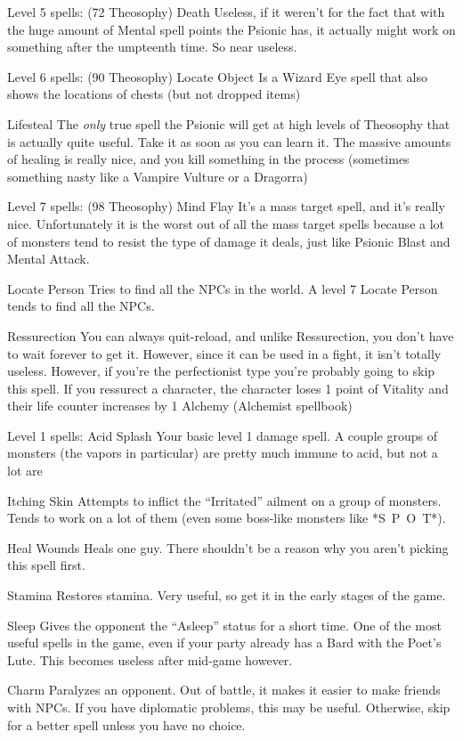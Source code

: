 \documentclass[12pt]{article}
\newcommand{\WviiSPOT}{\mbox{*S~P~O~T*}}
\begin{document}
Level 5 spells: (72 Theosophy) Death Useless, if it weren't for the fact
that with the huge amount of Mental spell points the Psionic has, it
actually might work on something after the umpteenth time. So near
useless.

Level 6 spells: (90 Theosophy) Locate Object Is a Wizard Eye spell that
also shows the locations of chests (but not dropped items)

Lifesteal The \emph{only} true spell the Psionic will get at high levels
of Theosophy that is actually quite useful. Take it as soon as you can
learn it. The massive amounts of healing is really nice, and you kill
something in the process (sometimes something nasty like a Vampire
Vulture or a Dragorra)

Level 7 spells: (98 Theosophy) Mind Flay It's a mass target spell, and
it's really nice. Unfortunately it is the worst out of all the mass
target spells because a lot of monsters tend to resist the type of
damage it deals, just like Psionic Blast and Mental Attack.

Locate Person Tries to find all the NPCs in the world. A level 7 Locate
Person tends to find all the NPCs.

Ressurection You can always quit-reload, and unlike Ressurection, you
don't have to wait forever to get it. However, since it can be used in a
fight, it isn't totally useless. However, if you're the perfectionist
type you're probably going to skip this spell. If you ressurect a
character, the character loses 1 point of Vitality and their life
counter increases by 1 Alchemy (Alchemist spellbook)

Level 1 spells: Acid Splash Your basic level 1 damage spell. A couple
groups of monsters (the vapors in particular) are pretty much immune to
acid, but not a lot are

Itching Skin Attempts to inflict the ``Irritated'' ailment on a group of
monsters. Tends to work on a lot of them (even some boss-like monsters
like \WviiSPOT{}).

Heal Wounds Heals one guy. There shouldn't be a reason why you aren't
picking this spell first.

Stamina Restores stamina. Very useful, so get it in the early stages of
the game.

Sleep Gives the opponent the ``Asleep'' status for a short time. One of
the most useful spells in the game, even if your party already has a
Bard with the Poet's Lute. This becomes useless after mid-game however.

Charm Paralyzes an opponent. Out of battle, it makes it easier to make
friends with NPCs. If you have diplomatic problems, this may be useful.
Otherwise, skip for a better spell unless you have no choice.
\end{document}
